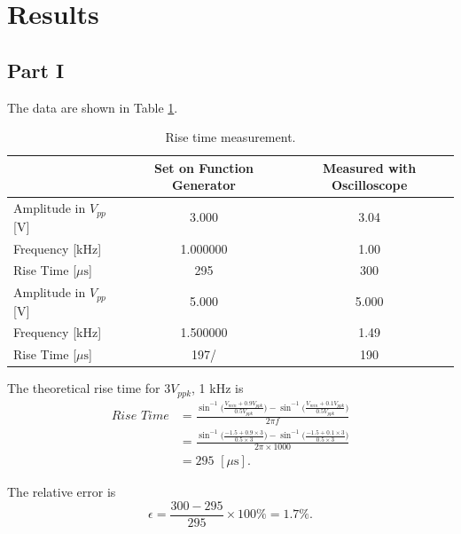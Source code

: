\documentclass{article}
\begin{document}
\section{Results}

\subsection{Part I}

The data are shown in Table \ref{Table1}.

\begin{table}[H]
    \centering
    \begin{tabular}{lcc}
        \toprule
                                  & Set on Function Generator & Measured with Oscilloscope \\
        \midrule
        Amplitude in $V_{pp}$ [V] & 3.000                     & 3.04                       \\
        Frequency [kHz]           & 1.000000                  & 1.00                       \\
        Rise Time [$\mu\text{s}$] & 295                       & 300                        \\
        \midrule
        Amplitude in $V_{pp}$ [V] & 5.000                     & 5.000                      \\
        Frequency [kHz]           & 1.500000                  & 1.49                       \\
        Rise Time [$\mu\text{s}$] & 197/                      & 190                        \\
        \bottomrule
    \end{tabular}
    \caption{Rise time measurement.}\label{Table1}
\end{table}

The theoretical rise time for $3V_{ppk}$, 1 kHz is
\begin{align*}
    Rise\,\,Time & = \frac{\sin^{-1}\big(\frac{V_{min}+0.9V_{ppk}}{0.5V_{ppk}}\big)-\sin^{-1}\big(\frac{V_{min}+0.1V_{ppk}}{0.5V_{ppk}}\big)}{2\pi f}         \\
                 & = \frac{\sin^{-1}\big(\frac{-1.5+0.9\times 3}{0.5\times 3}\big)-\sin^{-1}\big(\frac{-1.5+0.1\times 3}{0.5\times 3}\big)}{2\pi \times 1000} \\
                 & = 295\,\,[\mu\text{s}].
\end{align*}

The relative error is
$$\epsilon = \frac {300-295}{295}\times 100\% = 1.7\%.$$
\end{document}
